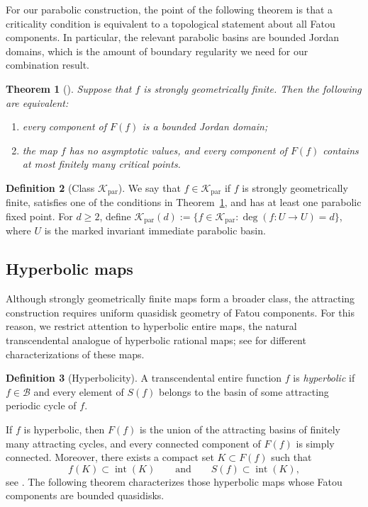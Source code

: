 \documentclass[11pt,a4paper, oneside]{amsart}
\newtheorem{thm}{Theorem}[section]
\theoremstyle{definition}
\newtheorem{defn}[thm]{Definition}
\theoremstyle{remark}
\numberwithin{equation}{section}
\def\B{{\mathcal{B}}}
\renewcommand{\ge}{\geqslant}
\newcommand{\parab}{{\text{par}}}
\begin{document}
For our parabolic construction, the point of the following theorem is that a criticality condition is equivalent to a topological statement about all Fatou components.  In particular, the relevant parabolic basins are bounded Jordan domains, which is the amount of boundary regularity we need for our combination result.

\begin{thm}[{\cite[Theorem 1.8]{ARS22_geomfinite}}]\label{thm:bounded_geomfinite} Suppose that $f$ is strongly geometrically finite. Then the following are equivalent:
	\begin{enumerate}[leftmargin=8mm]
		\item every component of $F(f)$ is a bounded Jordan domain;
		\item the map $f$ has no asymptotic values, and every component of $F(f)$ contains at most finitely many critical points.
	\end{enumerate}	
\end{thm}

\begin{defn}[Class $\mathscr K_\parab$]
	\label{Def:Kp}
	We say that $f\in \mathscr K_\parab$ if $f$ is strongly geometrically finite, satisfies one of the conditions in Theorem~\ref{thm:bounded_geomfinite}, and has at least one parabolic fixed point. For $d\ge2$, define $\mathscr K_{\parab}(d):=\{f\in\mathscr K_{\parab}:\deg(f\colon U\to U)=d\}$, where $U$ is the marked invariant immediate parabolic basin.
\end{defn}



\subsection{Hyperbolic maps}

Although strongly geometrically finite maps form a broader class, the attracting construction requires uniform quasidisk geometry of Fatou components. For this reason, we restrict attention to hyperbolic entire maps, the natural transcendental analogue of hyperbolic rational maps; see \cite{RS_hyperbolicity} for different characterizations of these maps.

\begin{defn}[Hyperbolicity]
	\label{Def:Ka}
	A transcendental entire function $f$ is \emph{hyperbolic} if $f\in \B$ and every element of $S(f)$ belongs to the basin of some attracting periodic cycle of $f$.
\end{defn}
If $f$ is hyperbolic, then $F(f)$ is the union of the attracting basins of finitely many attracting cycles, and every connected component of $F(f)$ is simply connected. Moreover, there exists a compact set $K\subset F(f)$ such that
\begin{equation}\label{eq:compact_hyperbolic}
f(K)\subset \operatorname{int}(K)
\qquad\text{and}\qquad
S(f)\subset \operatorname{int}(K),
\end{equation}
see \cite[Proposition~2.1]{BFR15_hyperbolic}. The following theorem characterizes those hyperbolic maps whose Fatou components are bounded quasidisks.
\end{document}
